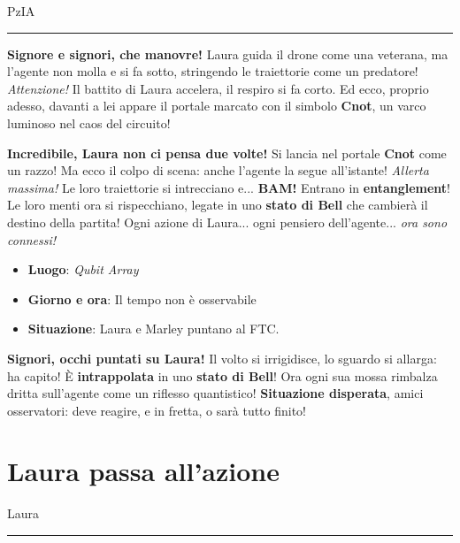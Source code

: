 
\vspace{1em}
\begin{center}PzIA\end{center}
\hrule
\vspace{1em}

\textbf{Signore e signori, che manovre!} Laura guida il drone come una veterana, ma l'agente non molla e si fa sotto, stringendo le traiettorie come un predatore! \emph{Attenzione!} Il battito di Laura accelera, il respiro si fa corto. Ed ecco, proprio adesso, davanti a lei appare il portale marcato con il simbolo \textbf{Cnot}, un varco luminoso nel caos del circuito!

\textbf{Incredibile, Laura non ci pensa due volte!} Si lancia nel portale \textbf{Cnot} come un razzo! Ma ecco il colpo di scena: anche l'agente la segue all'istante! \emph{Allerta massima!} Le loro traiettorie si intrecciano e... \textbf{BAM!} Entrano in \textbf{entanglement}! Le loro menti ora si rispecchiano, legate in uno \textbf{stato di Bell} che cambierà il destino della partita! Ogni azione di Laura... ogni pensiero dell'agente... \emph{ora sono connessi!}


\begin{tcolorbox}[colback=gray!5,colframe=gray!80,title=\textbf{Scheda Informativa}]
\begin{itemize}
    \item \textbf{Luogo}: \emph{Qubit Array}
    \item \textbf{Giorno e ora}: Il tempo non è osservabile
    \item \textbf{Situazione}: Laura e Marley puntano al FTC.
\end{itemize}
\end{tcolorbox}

\textbf{Signori, occhi puntati su Laura!} Il volto si irrigidisce, lo sguardo si allarga: ha capito! È \textbf{intrappolata} in uno \textbf{stato di Bell}! Ora ogni sua mossa rimbalza dritta sull'agente come un riflesso quantistico! \textbf{Situazione disperata}, amici osservatori: deve reagire, e in fretta, o sarà tutto finito!


\section{Laura passa all'azione}
\vspace{1em}
\begin{center}Laura\end{center}
\hrule
\vspace{1em}

